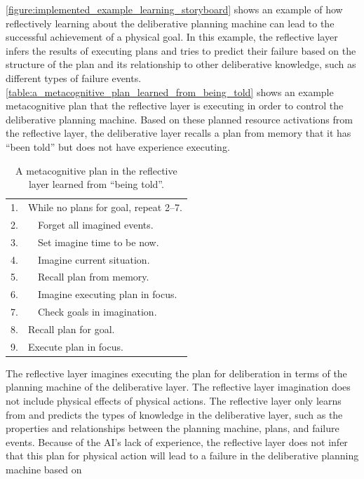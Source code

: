 {\mbox{\autoref{figure:implemented_example_learning_storyboard}}}
shows an example of how reflectively learning about the deliberative
planning machine can lead to the successful achievement of a physical
goal.  In this example, the reflective layer infers the results of
executing plans and tries to predict their failure based on the
structure of the plan and its relationship to other deliberative
knowledge, such as different types of failure events.
{\mbox{\autoref{table:a_metacognitive_plan_learned_from_being_told}}}
shows an example metacognitive plan that the reflective layer is
executing in order to control the deliberative planning machine.
Based on these planned resource activations from the reflective layer,
the deliberative layer recalls a plan from memory that it has ``been
told'' but does not have experience executing.
\begin{table}
\centering
\begin{tabular}{|rl|}
\hline
 1. & While no plans for goal, repeat 2--7.\\
 2. & ~~Forget all imagined events.\\
 3. & ~~Set imagine time to be now.\\
 4. & ~~Imagine current situation.\\
 5. & ~~Recall plan from memory.\\
 6. & ~~Imagine executing plan in focus.\\
 7. & ~~Check goals in imagination.\\
 8. & Recall plan for goal.\\
 9. & Execute plan in focus.\\
\hline
\end{tabular}
\caption[A metacognitive plan in the reflective layer learned from
  ``being told''.]{A metacognitive plan in the reflective layer
  learned from ``being told''.}
\label{table:a_metacognitive_plan_learned_from_being_told}
\end{table}
The reflective layer imagines executing the plan for deliberation in
terms of the planning machine of the deliberative layer.  The
reflective layer imagination does not include physical effects of
physical actions.  The reflective layer only learns from and predicts
the types of knowledge in the deliberative layer, such as the
properties and relationships between the planning machine, plans, and
failure events.  Because of the AI's lack of experience, the
reflective layer does not infer that this plan for physical action
will lead to a failure in the deliberative planning machine based on
